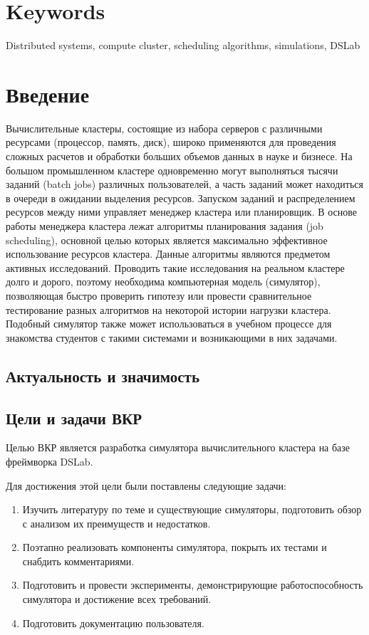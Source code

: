 \vspace{-0.5cm}
\section*{Keywords}
Distributed systems, compute cluster, scheduling algorithms, simulations, DSLab 

\newpage 

\section{Введение}

Вычислительные кластеры, состоящие из набора серверов с различными ресурсами (процессор, память, диск), широко применяются для проведения сложных расчетов и обработки больших объемов данных в науке и бизнесе. На большом промышленном кластере одновременно могут выполняться тысячи заданий (batch jobs) различных пользователей, а часть заданий может находиться в очереди в ожидании выделения ресурсов. Запуском заданий и распределением ресурсов между ними управляет менеджер кластера или планировщик. В основе работы менеджера кластера лежат алгоритмы планирования задания (job scheduling), основной целью которых является максимально эффективное использование ресурсов кластера. Данные алгоритмы являются предметом активных исследований. Проводить такие исследования на реальном кластере долго и дорого, поэтому необходима компьютерная модель (симулятор), позволяющая быстро проверить гипотезу или провести сравнительное тестирование разных алгоритмов на некоторой истории нагрузки кластера. Подобный симулятор также может использоваться в учебном процессе для знакомства студентов с такими системами и возникающими в них задачами.

\subsection{Актуальность и значимость}


\subsection{Цели и задачи ВКР}

Целью ВКР является разработка симулятора вычислительного кластера на базе фреймворка DSLab. 

Для достижения этой цели были поставлены следующие задачи: 
\begin{enumerate}
\item  Изучить литературу по теме и существующие симуляторы, подготовить обзор с анализом их преимуществ и недостатков.
\item Поэтапно реализовать компоненты симулятора, покрыть их тестами и снабдить комментариями.
\item Подготовить и провести эксперименты, демонстрирующие работоспособность симулятора и достижение всех требований.
\item Подготовить документацию пользователя.
\end{enumerate}

